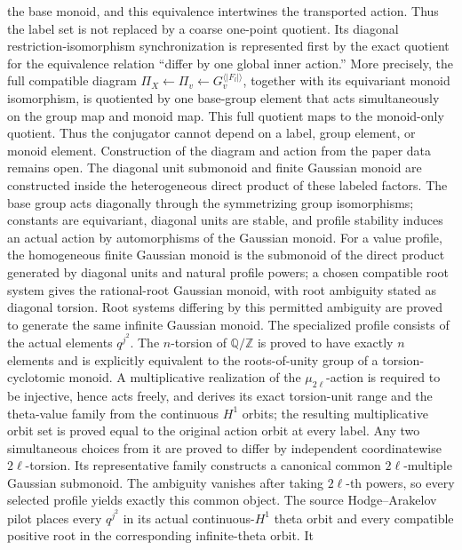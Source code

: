 \begin{definition}
  the base monoid, and this equivalence intertwines the transported action.
  Thus the label set is not replaced by a coarse one-point quotient.  Its diagonal
  restriction-isomorphism synchronization is represented first by the exact
  quotient for the equivalence relation ``differ by one global inner action.''
  More precisely, the full compatible diagram
  \(\Pi_X\leftarrow\Pi_v\leftarrow G_v^{\langle|F_l|\rangle}\), together with
  its equivariant monoid isomorphism, is quotiented by one base-group element
  that acts simultaneously on the group map and monoid map.  This full
  quotient maps to the monoid-only quotient.  Thus the conjugator cannot
  depend on a label, group element, or monoid element.  Construction of the
  diagram and action from the paper data remains open.  The diagonal
  unit submonoid and finite Gaussian monoid are constructed inside the
  heterogeneous direct product of these labeled factors.  The base group acts
  diagonally through the symmetrizing group isomorphisms; constants are
  equivariant, diagonal units are stable, and profile stability induces an
  actual action by automorphisms of the Gaussian monoid.  For a value
  profile, the homogeneous finite Gaussian monoid is the submonoid of
  the direct product generated by diagonal units and natural profile powers;
  a chosen compatible root system gives the rational-root Gaussian monoid,
  with root ambiguity stated as diagonal torsion.  Root systems differing by
  this permitted ambiguity are proved to generate the same infinite Gaussian
  monoid.  The specialized profile consists of the actual elements
  \(q^{j^2}\).  The \(n\)-torsion of \(\mathbb Q/\mathbb Z\) is proved to
  have exactly \(n\) elements and is explicitly equivalent to the
  roots-of-unity group of a torsion-cyclotomic monoid.  A multiplicative
  realization of the \(\mu_{2\ell}\)-action is required to be injective,
  hence acts freely, and derives its exact torsion-unit range and the
  theta-value family from the continuous \(H^1\) orbits; the resulting
  multiplicative orbit set is proved equal to the original action orbit at
  every label.  Any two
  simultaneous choices from it are proved to differ by independent
  coordinatewise \(2\ell\)-torsion.  Its representative family constructs a
  canonical common \(2\ell\)-multiple Gaussian submonoid.  The ambiguity
  vanishes after taking \(2\ell\)-th powers, so every selected profile yields
  exactly this common object.  The source Hodge--Arakelov pilot places every
  \(q^{j^2}\) in its actual continuous-\(H^1\) theta orbit and every
  compatible positive root in the corresponding infinite-theta orbit.  It

\end{definition}
